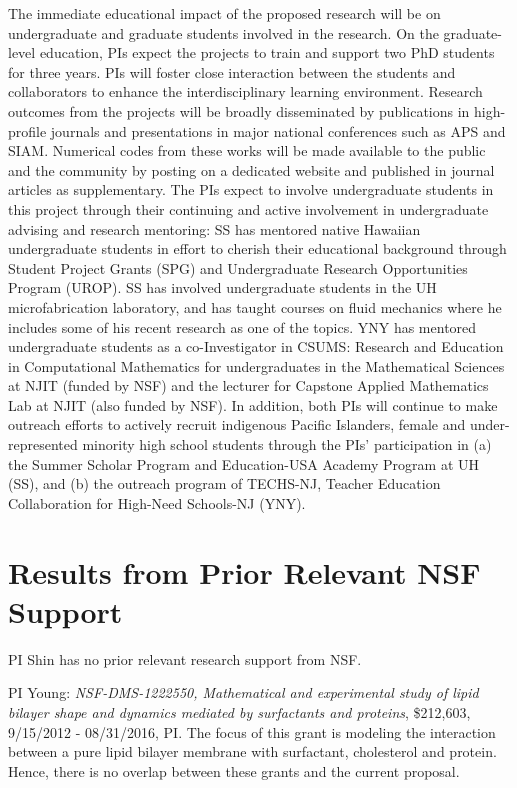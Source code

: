 \documentclass[11pt]{article}
\begin{document}
The immediate educational impact of the proposed research will be on
undergraduate and graduate students involved in the research. On the
graduate-level education, PIs expect the projects to train and support
two PhD students for three years. PIs will foster close interaction
between the students and collaborators to enhance the interdisciplinary
learning environment. Research outcomes from the projects will be
broadly disseminated by publications in high-profile journals and
presentations in major national conferences such as APS and SIAM.
Numerical codes from these works will be made available to the public
and the community by posting on a dedicated website and published in
journal articles as supplementary.  The PIs expect to involve
undergraduate students in this project through their continuing and
active involvement in undergraduate advising and research mentoring: SS
has mentored native Hawaiian undergraduate students in effort to cherish
their educational background through Student Project Grants (SPG) and
Undergraduate Research Opportunities Program (UROP). SS has involved
undergraduate students in the UH microfabrication laboratory, and has
taught courses on fluid mechanics where he includes some of his recent
research as one of the topics. YNY has mentored undergraduate students
as a co-Investigator in CSUMS: Research and Education in Computational
Mathematics for undergraduates in the Mathematical Sciences at NJIT
(funded by NSF) and the lecturer for Capstone Applied Mathematics Lab at
NJIT (also funded by NSF).  In addition, both PIs will continue to make
outreach efforts to actively recruit indigenous Pacific Islanders,
female and under-represented minority high school students through the
PIs' participation in (a) the Summer Scholar Program and Education-USA
Academy Program at UH (SS), and (b) the outreach program of TECHS-NJ,
Teacher Education Collaboration for High-Need Schools-NJ (YNY).

\vspace*{-7pt}
\section{Results from Prior Relevant NSF Support}
\vspace*{-7pt}

\noindent
PI Shin has no prior relevant research support from NSF.

\noindent
PI Young: {\it NSF-DMS-1222550, Mathematical and experimental study of
lipid bilayer shape and dynamics mediated by surfactants and proteins},
\$212,603, 9/15/2012 - 08/31/2016, PI.  The focus of this grant is
modeling the interaction between a pure lipid bilayer membrane with
surfactant, cholesterol and protein.  Hence, there is no overlap between
these grants and the current proposal.
\end{document}
